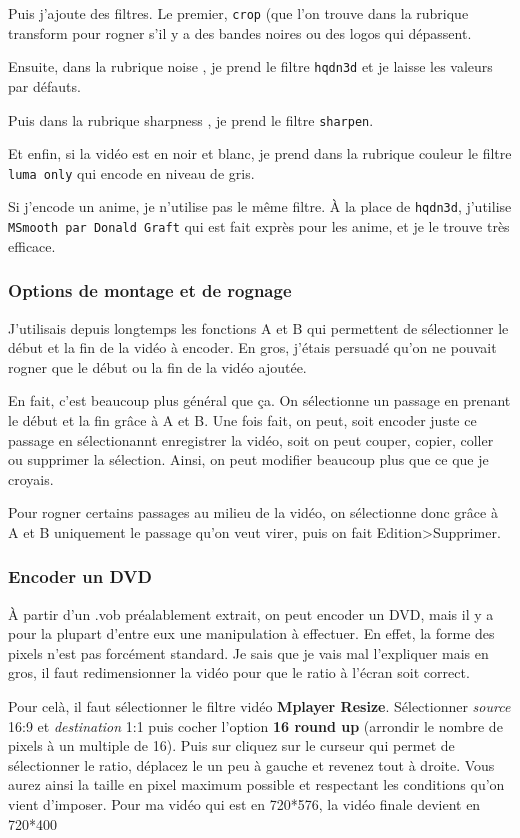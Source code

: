 \documentclass[a4paper,twoside]{article}
\begin{document}
\bigskip

Puis j'ajoute des filtres. Le premier, \texttt{crop} (que l'on trouve dans la rubrique \og transform \fg    pour rogner s'il y a des bandes noires ou des logos qui dépassent.

Ensuite, dans la rubrique \og noise \fg,  je prend le filtre \texttt{hqdn3d} et je laisse les valeurs par défauts.

Puis dans la rubrique \og sharpness \fg, je prend le filtre \texttt{sharpen}.

Et enfin, si la vidéo est en noir et blanc, je prend dans la rubrique \og couleur \fg   le filtre \texttt{luma only} qui encode en niveau de gris.

Si j'encode un anime, je n'utilise pas le même filtre. À la place de \texttt{hqdn3d}, j'utilise \texttt{MSmooth par Donald Graft} qui est fait exprès pour les anime, et je le trouve très efficace.

\subsubsection{Options de montage et de rognage}
J'utilisais depuis longtemps les fonctions A et B qui permettent de sélectionner le début et la fin de la vidéo à encoder. En gros, j'étais persuadé qu'on ne pouvait rogner que le début ou la fin de la vidéo ajoutée.

En fait, c'est beaucoup plus général que ça. On sélectionne un passage en prenant le début et la fin grâce à A et B. Une fois fait, on peut, soit encoder juste ce passage en sélectionannt \og enregistrer la vidéo\fg, soit on peut couper, copier, coller ou supprimer la sélection. Ainsi, on peut modifier beaucoup plus que ce que je croyais.

Pour rogner certains passages au milieu de la vidéo, on sélectionne donc grâce à A et B uniquement le passage qu'on veut virer, puis on fait Edition>Supprimer.

\subsubsection{Encoder un DVD}\label{sec:encoder_DVD}
À partir d'un .vob préalablement extrait, on peut encoder un DVD, mais il y a pour la plupart d'entre eux une manipulation à effectuer. En effet, la forme des pixels n'est pas forcément standard. Je sais que je vais mal l'expliquer mais en gros, il faut redimensionner la vidéo pour que le ratio à l'écran soit correct.

Pour celà, il faut sélectionner le filtre vidéo \textbf{Mplayer Resize}. Sélectionner \emph{source} 16:9 et \emph{destination} 1:1 puis cocher l'option \textbf{16 round up} (arrondir le nombre de pixels à un multiple de 16). Puis sur cliquez sur le curseur qui permet de sélectionner le ratio, déplacez le un peu à gauche et revenez tout à droite. Vous aurez ainsi la taille en pixel maximum possible et respectant les conditions qu'on vient d'imposer. Pour ma vidéo qui est en 720*576, la vidéo finale devient en 720*400
\end{document}

